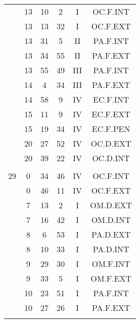 \documentclass[12pt, a4paper]{article}
\begin{document}
\begin{multicols}{3}
{\begin{tabular}{c c c c c c}
	 	 	 	 & 13 & 10 & 2 & I & OC.F.INT\\%
	 	 	 	 & 13 & 13 & 32 & I & OC.F.EXT\\%
	 	 	 	 & 13 & 31 & 5 & II & PA.F.INT\\%
	 	 	 	 & 13 & 34 & 55 & II & PA.F.EXT\\%
	 	 	 	 & 13 & 55 & 49 & III & PA.F.INT\\%
	 	 	 	 & 14 & 4 & 34 & III & PA.F.EXT\\%
	 	 	 	 & 14 & 58 & 9 & IV & EC.F.INT\\%
	 	 	 	 & 15 & 11 & 9 & IV & EC.F.EXT\\%
	 	 	 	 & 15 & 19 & 34 & IV & EC.F.PEN\\%
	 	 	 	 & 20 & 27 & 52 & IV & OC.D.EXT\\%
	 	 	 	 & 20 & 39 & 22 & IV & OC.D.INT\\%
	 	 	 	 & & & & & \\%
	 	 	 	29 & 0 & 34 & 46 & IV & OC.F.INT\\%
	 	 	 	 & 0 & 46 & 11 & IV & OC.F.EXT\\%
	 	 	 	 & 7 & 13 & 2 & I & OM.D.EXT\\%
	 	 	 	 & 7 & 16 & 42 & I & OM.D.INT\\%
	 	 	 	 & 8 & 6 & 53 & I & PA.D.EXT\\%
	 	 	 	 & 8 & 10 & 33 & I & PA.D.INT\\%
	 	 	 	 & 9 & 29 & 30 & I & OM.F.INT\\%
	 	 	 	 & 9 & 33 & 5 & I & OM.F.EXT\\%
	 	 	 	 & 10 & 23 & 51 & I & PA.F.INT\\%
	 	 	 	 & 10 & 27 & 26 & I & PA.F.EXT\\%
	 	 	 	 & & & & & \\%

\end{tabular}}
\end{multicols}
\end{document}
